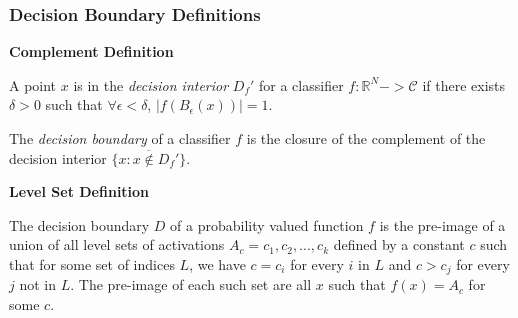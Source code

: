 
\begin{frame}
  \frametitle{Decision Boundary Definitions}
  
\textbf{Complement Definition}
\begin{definition}
 A point $x$ is in the \emph{decision interior} $D_f'$ for a classifier $f: \mathbb{R}^N -> \mathcal{C}$ if there exists $\delta > 0$ such that $\forall \epsilon < \delta$, $|f(B_\epsilon(x))| = 1$. 

 The \emph{decision boundary} of a classifier $f$ is the closure of the complement of the decision interior $\overline{\{x : x \notin D_f'\}}$. 
\end{definition}
 \textbf{Level Set Definition}

 \begin{definition}
   The decision boundary $D$ of a probability valued function $f$ is the pre-image of a union of all level sets of activations $A_c = {c_1, c_2, ..., c_k}$ defined by a constant $c$ such that for some set of indices $L$, we have $c = c_i$ for every $i$ in $L$ and $c > c_j$ for every $j$ not in $L$. The pre-image of each such set are all $x$ such that $f(x) = A_c$ for some $c$. 
 \end{definition}
 \end{frame}



